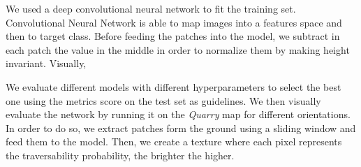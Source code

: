 \documentclass[../document.tex]{subfiles}
\begin{document}
We used a deep convolutional neural network to fit the training set. Convolutional Neural Network is able to map images into a features space and then to target class. 
Before feeding the patches into the model, we subtract in each patch the value in the middle in order to normalize them by making height invariant. Visually,

We evaluate different models with different hyperparameters to select the best one using the metrics score on the test set as guidelines. We then visually evaluate the network by running it on the \emph{Quarry} map for different orientations. In order to do so, we extract patches form the ground using a sliding window and feed them to the model. Then, we create a texture where each pixel represents the traversability probability, the brighter the higher.
\end{document}
